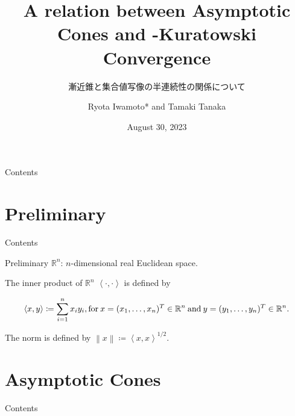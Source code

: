 \documentclass[aspectratio=169, dvipdfmx, 11pt]{beamer} %
\title[continuous properties of asymptotic cone ]{A relation between Asymptotic Cones and \Painleve-Kuratowski Convergence}
\subtitle{漸近錐と集合値写像の半連続性の関係について}
\author[Ryota Iwamoto]{Ryota Iwamoto* and Tamaki Tanaka}
\institute[Niigata Univ]{Niigata Univ}
\date{August 30, 2023}
\newcommand{\NDemenstionalRealEuclideanSpace}{\mathbb{R}^n}
\begin{document}
\maketitle

\begin{frame}{Contents}
  \tableofcontents
\end{frame}

\section{Preliminary}
\begin{frame}{Contents}
  \tableofcontents[currentsection]
\end{frame}

\begin{frame}{Preliminary}
$\NDemenstionalRealEuclideanSpace$: $n$-dimensional real Euclidean space.

The inner product of $\NDemenstionalRealEuclideanSpace$ $\left\langle \cdot ,\cdot \right\rangle$  is defined by

\begin{equation}
  \left\langle x,y\right\rangle \coloneqq \sum_{i = 1}^{n} x_i y_i, \text{for}\: x=(x_1,\dots,x_n)^T \in \mathbb{R}^n \:\text{and}\: y=(y_1,\dots,y_n)^T \in \mathbb{R}^n. \notag
\end{equation}

The norm is defined by $\left\lVert x \right\rVert \coloneqq \left\langle x,x\right\rangle ^{1/2} $.

\end{frame}

\section{Asymptotic Cones}
\begin{frame}{Contents}
  \tableofcontents[currentsection]
\end{frame}
\end{document}
